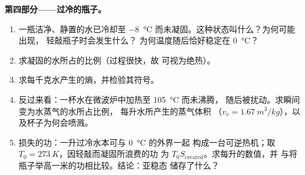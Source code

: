 \begin{problem}
\medskip
\noindent\textbf{第四部分——过冷的瓶子。}
\begin{enumerate}[resume]
  \item 一瓶洁净、静置的水已冷却至 \qty{-8}{\degreeCelsius}
        而未凝固。这种状态叫什么？为何可能出现，
        轻敲瓶子时会发生什么？
        为何温度随后恰好稳定在 \qty{0}{\degreeCelsius}？
  \item 求凝固的水所占的比例（过程很快，故
        可视为绝热）。
  \item 求每千克水产生的熵，并检验其符号。
  \item 反过来看：一杯水在微波炉中加热至 \qty{105}{\degreeCelsius} 而未沸腾，
        随后被扰动。求瞬间变为水蒸气的水所占比例，
        每升水所产生的蒸气体积
        （$v_v = \qty{1.67}{m^3/kg}$），以及杯子为何会喷溅。
  \item 损失的功：一升过冷水本可与 \qty{0}{\degreeCelsius} 的外界一起
        构成一台可逆热机；取
        $T_0 = \qty{273}{K}$，因轻敲而凝固所浪费的功
        为 $T_0S_{\mathrm{created}}$。求每升的数值，并
        与将瓶子举高一米的功相比较。结论：亚稳态
        储存了什么？
\end{enumerate}
\end{problem}
